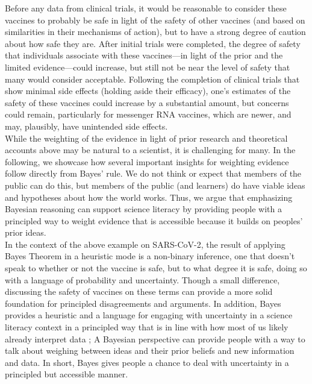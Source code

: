 Before any data from clinical trials, it would be reasonable to consider these vaccines to probably be safe in light of the safety of other vaccines (and based on similarities in their mechanisms of action), but to have a strong degree of caution about how safe they are. After initial trials were completed, the degree of safety that individuals associate with these vaccines—in light of the prior and the limited evidence—could increase, but still not be near the level of safety that many would consider acceptable. Following the completion of clinical trials that show minimal side effects (holding aside their efficacy), one’s estimates of the safety of these vaccines could increase by a substantial amount, but concerns could remain, particularly for messenger RNA vaccines, which are newer, and may, plausibly, have unintended side effects. \\

While the weighting of the evidence in light of prior research and theoretical accounts above may be natural to a scientist, it is challenging for many. In the following, we showcase how several important insights for weighting evidence follow directly from Bayes' rule. We do not think or expect that members of the public can do this, but members of the public (and learners) do have viable ideas and hypotheses about how the world works. Thus, we argue that emphasizing Bayesian reasoning can support science literacy by providing people with a principled way to weight evidence that is accessible because it builds on peoples' prior ideas. \\

In the context of the above example on SARS-CoV-2, the result of applying Bayes Theorem in a heuristic mode is a non-binary inference, one that doesn't speak to whether or not the vaccine is safe, but to what degree it is safe, doing so with a language of probability and uncertainty. Though a small difference, discussing the safety of vaccines on these terms can provide a more solid foundation for principled disagreements and arguments. In addition, Bayes provides a heuristic and a language for engaging with uncertainty in a science literacy context in a principled way that is in line with how most of us likely already interpret data \parencite{tgk06, gw12, gh95}; A Bayesian perspective can provide people with a way to talk about weighing between ideas and their prior beliefs and new information and data. In short, Bayes gives people a chance to deal with uncertainty in a principled but accessible manner. \\

